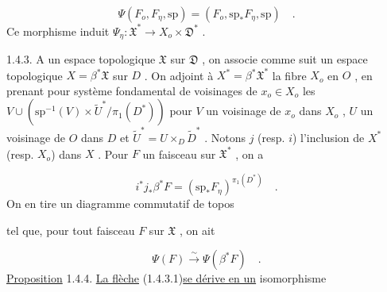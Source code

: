 \begin{equation*}
\Psi(F_o, F_\eta , \mathrm{sp}) = (F_o, \mathrm{sp}_* F_\eta , \mathrm{sp}) \quad .
\end{equation*}
Ce morphisme induit $\Psi_\eta : \mathfrak{X}^* \longrightarrow X_o \times \mathfrak{D}^*$ .

1.4.3. A un espace topologique $\mathfrak{X}$ sur $\mathfrak{D}$ , on associe comme suit un espace topologique $X = \beta^* \mathfrak{X}$ sur $D$ . On adjoint à $X^* = \beta^* \mathfrak{X}^*$ la fibre $X_o$ en $O$ , en prenant pour système fondamental de voisinages de $x_o \in X_o$ les $V \cup (\mathrm{sp}^{-1}(V) \times \widetilde{U}^*/\pi_1(D^*))$ pour $V$ un voisinage de $x_o$ dans $X_o$ , $U$ un voisinage de $O$ dans $D$ et $\widetilde{U}^* = U \times_D \widetilde{D}^*$ . Notons $j$ (resp. $i$) l'inclusion de $X^*$ (resp. $X_o$) dans $X$ . Pour $F$ un faisceau sur $\mathfrak{X}^*$ , on a

\begin{equation*}
i^* j_* \beta^* F = (\mathrm{sp}_* F_\eta)^{\pi_1(D^*)} \quad .
\end{equation*}
On en tire un diagramme commutatif de topos

\begin{center}
\end{center}
tel que, pour tout faisceau $F$ sur $\mathfrak{X}$ , on ait

\begin{equation}\tag{1.4.3.1}
\Psi(F) \stackrel{\sim}{\longrightarrow} \Psi(\beta^* F) \quad .
\end{equation}
\underline{Proposition} 1.4.4. \underline{La flèche} (1.4.3.1)\underline{se dérive en un} isomorphisme

